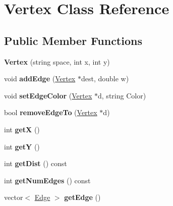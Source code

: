 \hypertarget{class_vertex}{\section{Vertex Class Reference}
\label{class_vertex}
}
\subsection*{Public Member Functions}
\begin{DoxyCompactItemize}
\item 
\hypertarget{class_vertex_a5f1bea702a6a6f92bb08c8b36eeb5991}{{\bfseries Vertex} (string space, int x, int y)}\label{class_vertex_a5f1bea702a6a6f92bb08c8b36eeb5991}

\item 
\hypertarget{class_vertex_a80189017e5f5be4084232e5495007c72}{void {\bfseries add\-Edge} (\hyperlink{class_vertex}{Vertex} $\ast$dest, double w)}\label{class_vertex_a80189017e5f5be4084232e5495007c72}

\item 
\hypertarget{class_vertex_adcb35ad2d3c26d1475f1d57c811f6b9a}{void {\bfseries set\-Edge\-Color} (\hyperlink{class_vertex}{Vertex} $\ast$d, string Color)}\label{class_vertex_adcb35ad2d3c26d1475f1d57c811f6b9a}

\item 
\hypertarget{class_vertex_a0fb9defc6bc64bd16e51bcf867c511cf}{bool {\bfseries remove\-Edge\-To} (\hyperlink{class_vertex}{Vertex} $\ast$d)}\label{class_vertex_a0fb9defc6bc64bd16e51bcf867c511cf}

\item 
\hypertarget{class_vertex_a9989a003fe4af0ccef228647004ca360}{int {\bfseries get\-X} ()}\label{class_vertex_a9989a003fe4af0ccef228647004ca360}

\item 
\hypertarget{class_vertex_af410bc33033e2e09bcbe16be654156cd}{int {\bfseries get\-Y} ()}\label{class_vertex_af410bc33033e2e09bcbe16be654156cd}

\item 
\hypertarget{class_vertex_af207259cac4722babb351d88caae2489}{int {\bfseries get\-Dist} () const }\label{class_vertex_af207259cac4722babb351d88caae2489}

\item 
\hypertarget{class_vertex_a0988796727c76d1161c656f696ee0997}{int {\bfseries get\-Num\-Edges} () const }\label{class_vertex_a0988796727c76d1161c656f696ee0997}

\item 
\hypertarget{class_vertex_a6ec24a2ce1802c7e1719cc542d61dbd1}{vector$<$ \hyperlink{class_edge}{Edge} $>$ {\bfseries get\-Edge} ()}\label{class_vertex_a6ec24a2ce1802c7e1719cc542d61dbd1}


\end{DoxyCompactItemize}
